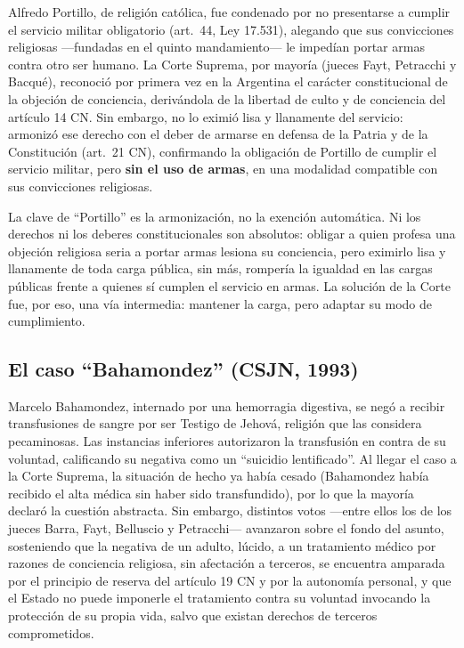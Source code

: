 \documentclass[12pt,oneside]{book}
\begin{document}
\begin{exbox}
Alfredo Portillo, de religión católica, fue condenado por no presentarse a
cumplir el servicio militar obligatorio (art.\ 44, Ley 17.531), alegando que sus
convicciones religiosas —fundadas en el quinto mandamiento— le impedían portar
armas contra otro ser humano. La Corte Suprema, por mayoría (jueces Fayt,
Petracchi y Bacqué), reconoció por primera vez en la Argentina el carácter
constitucional de la objeción de conciencia, derivándola de la libertad de culto y
de conciencia del artículo 14 CN. Sin embargo, no lo eximió lisa y llanamente del
servicio: armonizó ese derecho con el deber de armarse en defensa de la Patria y
de la Constitución (art.\ 21 CN), confirmando la obligación de Portillo de
cumplir el servicio militar, pero \textbf{sin el uso de armas}, en una modalidad
compatible con sus convicciones religiosas.
\end{exbox}

\begin{impbox}
La clave de ``Portillo'' es la armonización, no la exención automática. Ni los
derechos ni los deberes constitucionales son absolutos: obligar a quien profesa
una objeción religiosa seria a portar armas lesiona su conciencia, pero eximirlo
lisa y llanamente de toda carga pública, sin más, rompería la igualdad en las
cargas públicas frente a quienes sí cumplen el servicio en armas. La solución de
la Corte fue, por eso, una vía intermedia: mantener la carga, pero adaptar su
modo de cumplimiento.
\end{impbox}

\subsection{El caso ``Bahamondez'' (CSJN, 1993)}

\begin{exbox}
Marcelo Bahamondez, internado por una hemorragia digestiva, se negó a recibir
transfusiones de sangre por ser Testigo de Jehová, religión que las considera
pecaminosas. Las instancias inferiores autorizaron la transfusión en contra de su
voluntad, calificando su negativa como un ``suicidio lentificado''. Al llegar el
caso a la Corte Suprema, la situación de hecho ya había cesado (Bahamondez había
recibido el alta médica sin haber sido transfundido), por lo que la mayoría
declaró la cuestión abstracta. Sin embargo, distintos votos —entre ellos los de
los jueces Barra, Fayt, Belluscio y Petracchi— avanzaron sobre el fondo del
asunto, sosteniendo que la negativa de un adulto, lúcido, a un tratamiento médico
por razones de conciencia religiosa, sin afectación a terceros, se encuentra
amparada por el principio de reserva del artículo 19 CN y por la autonomía
personal, y que el Estado no puede imponerle el tratamiento contra su voluntad
invocando la protección de su propia vida, salvo que existan derechos de terceros
comprometidos.
\end{exbox}
\end{document}
